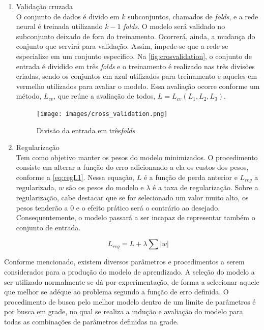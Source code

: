 \documentclass[
    12pt,
    oneside,
    a4paper,
    english,
    brazil
]{abntex2}
\begin{document}
\begin{enumerate}
    \item Validação cruzada\\
        O conjunto de  dados é divido em $k$ subconjuntos, chamados de \textit{folds}, e a
        rede neural é  treinada utilizando $k-1$ \textit{folds}.  O modelo será
        validado  no  subconjunto deixado  de  fora  do treinamento.  Ocorrerá,
        ainda,  a  mudança  do  conjunto que  servirá  para  validação.  Assim,
        impede-se  que a  rede se  especialize  em um  conjunto especifico.  Na
        \autoref{fig:crosvalidation}, o conjunto de  entrada é dividido em três
        \textit{folds} e o  treinamento é realizado nas  três divisões criadas,
        sendo os  conjuntos em  azul utilizados para  treinamento e  aqueles em
        vermelho  utilizados  para  avaliar  o modelo.  Essa  avaliação  ocorre
        conforme um  método, $L_{cv}$,  que reúne  a avaliação  de todos,  $L =
        L_{cv}(L_1, L_2, L_3)$.

        \begin{figure}[ht]
            \centering
            \caption{Divisão da entrada em três\textit{folds}}\label{fig:crosvalidation}
            \texttt{[image: images/cross\_validation.png]}
        \end{figure}

    \item Regularização\\
        Tem como objetivo manter os pesos do modelo minimizados. O procedimento
        consiste em  alterar a função do  erro adicionando a ela  os custos dos
        pesos,  conforme  a \autoref{eq:regL1}.  Nessa equação, $L$ é  a
        função de perda  anterior e $L_{reg}$ a regularizada, $w$  são os pesos
        do modelo  e $\lambda$  é a  taxa de  regularização. Sobre a regularização, 
        cabe destacar que se for selecionado um
        valor muito  alto, os pesos  tenderão a $0$ e  o efeito prático  será o
        contrário ao desejado. Consequentemente, o modelo passará a ser incapaz
        de representar também o conjunto de entrada.

        \begin{equation}\label{eq:regL1}
            L_{reg} = L + \lambda \sum{|w|}
        \end{equation}
\end{enumerate}

Conforme mencionado, existem diversos parâmetros e procedimentos a serem considerados para a produção do modelo de aprendizado. A seleção do modelo a ser utilizado normalmente se dá por experimentação, de forma a selecionar aquele que melhor se adéque ao problema segundo a  função de erro definida. O procedimento de busca pelo melhor modelo dentro de um limite de parâmetros é por busca em grade, no qual se realiza a indução e avaliação do modelo
para todas as combinações de parâmetros definidas na grade.
\end{document}
